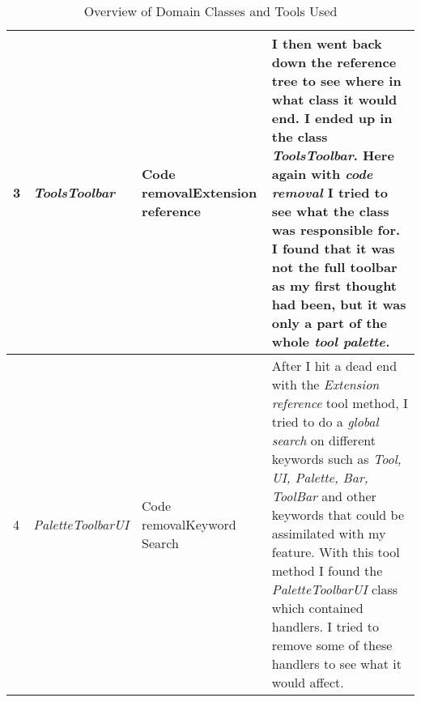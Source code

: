\begin{table}[h]
\begin{tabular}{|p{0.5cm}|p{3.5cm}|p{3.5cm}|p{8cm}|}
        3           & \textit{ToolsToolbar}       & Code removal\newline Extension reference                          & I then went back down the reference tree to see where in what class it would end. I ended up in the class \textit{ToolsToolbar}. Here again with \textit{code removal} I tried to see what the class was responsible for. I found that it was not the full toolbar as my first thought had been, but it was only a part of the whole \textit{tool palette.}                                                                                                                                     \\ \hline
        4           & \textit{PaletteToolbarUI}   & Code removal\newline Keyword Search                               & After I hit a dead end with the \textit{Extension reference} tool method, I tried to do a \textit{global search} on different keywords such as \textit{Tool, UI, Palette, Bar, ToolBar} and other keywords that could be assimilated with my feature. With this tool method I found the \textit{PaletteToolbarUI} class which contained handlers. I tried to remove some of these handlers to see what it would affect.                                                                         \\ \hline
    \end{tabular}
    \caption{Overview of Domain Classes and Tools Used}
    \label{table:domain-classes}
\end{table}


